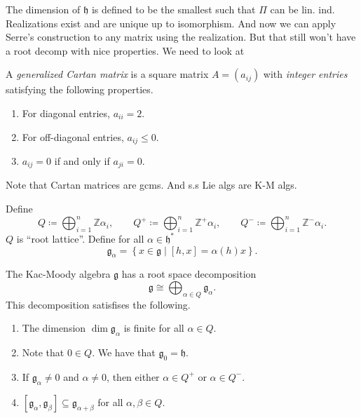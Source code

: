 \documentclass[11pt, letterpaper]{article}
\theoremstyle{plain}
\begin{document}
The dimension of $\mathfrak{h}$ is defined to be the smallest such that $\Pi $ can be lin. ind. Realizations exist and are unique up to isomorphism. And now we can apply Serre's construction to any matrix using the realization. But that still won't have a root decomp with nice properties. We need to look at

\begin{definition}\label{dfn:6-3}
	A \emph{generalized Cartan matrix} is a square matrix $A=(a_{ij} )$ with \emph{integer entries} satisfying the following properties.
	\begin{enumerate}[label=(\arabic*), align=right]
		\item For diagonal entries, $a_{ii} =2$.
		\item For off-diagonal entries, $a_{ij} \leq 0$.
		\item $a_{ij} =0$ if and only if $a_{ji} =0$.
	\end{enumerate}
\end{definition}

Note that Cartan matrices are gcms. And s.s Lie algs are K-M algs.

Define
\[
	Q\coloneqq \bigoplus_{i=1}^n \mathbb{Z} \alpha _i,\qquad Q^+ \coloneqq \bigoplus_{i=1}^{n} \mathbb{Z} ^+\alpha _i,\qquad Q^- \coloneqq \bigoplus_{i=1}^{n} \mathbb{Z} ^-\alpha _i.
\]
$Q$ is ``root lattice''. Define for all $\alpha \in \mathfrak{h} ^*$
\[
	\mathfrak{g} _{\alpha } =\left\{ x\in \mathfrak{g} \mid [h,x]=\alpha (h)x \right\} 
.\]


\begin{theorem}\label{thm:6-4}
	The Kac-Moody algebra $\mathfrak{g} $ has a root space decomposition
	\[
		\mathfrak{g} \cong \bigoplus_{\alpha \in Q} \mathfrak{g} _{\alpha } 
	.\]
	This decomposition satisfises the following.
	\begin{enumerate}[align=right, label=(\arabic*)]
		\item The dimension $\dim \mathfrak{g} _{\alpha } $ is finite for all $\alpha \in Q$.
		\item Note that $0\in Q$. We have that $\mathfrak{g} _0=\mathfrak{h} $.
		\item If $\mathfrak{g} _\alpha \neq 0$ and $\alpha \neq 0$, then either $\alpha \in Q^+$ or $\alpha \in Q^-$.
		\item $[\mathfrak{g} _\alpha ,\mathfrak{g} _\beta ]\subseteq \mathfrak{g} _{\alpha +\beta } $ for all $\alpha ,\beta \in Q$.
	\end{enumerate}
\end{theorem}
\end{document}
